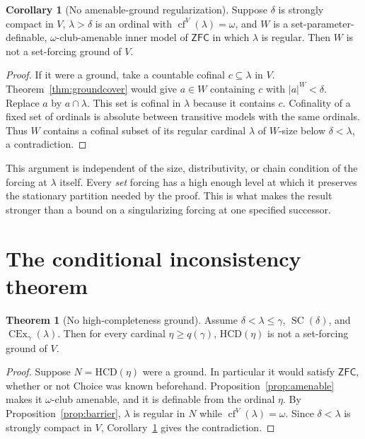 \documentclass[11pt,letterpaper]{article}
\theoremstyle{definition}
\newtheorem{theorem}[definition]{Theorem}
\newtheorem{corollary}[definition]{Corollary}
\numberwithin{equation}{section}
\newcommand{\ZFC}{\mathsf{ZFC}}
\newcommand{\HCD}{\mathrm{HCD}}
\newcommand{\SC}{\operatorname{SC}}
\newcommand{\CEx}{\operatorname{CEx}}
\newcommand{\cf}{\operatorname{cf}}
\begin{document}
\begin{corollary}[No amenable-ground regularization]\label{cor:noregularization}
Suppose $\delta$ is strongly compact in $V$, $\lambda>\delta$ is an
ordinal with $\cf^V(\lambda)=\omega$, and $W$ is a set-parameter-definable,
$\omega$-club-amenable inner model of $\ZFC$ in which $\lambda$ is
regular. Then $W$ is not a set-forcing ground of $V$.
\end{corollary}
\begin{proof}
If it were a ground, take a countable cofinal $c\subseteq\lambda$ in
$V$. Theorem~\ref{thm:groundcover} would give $a\in W$ containing $c$
with $|a|^W<\delta$. Replace $a$ by $a\cap\lambda$. This set is
cofinal in $\lambda$ because it contains $c$. Cofinality of a fixed set
of ordinals is absolute between transitive models with the same
ordinals. Thus $W$ contains a cofinal subset of its regular cardinal
$\lambda$ of $W$-size below $\delta<\lambda$, a contradiction.
\end{proof}

This argument is independent of the size, distributivity, or chain
condition of the forcing at $\lambda$ itself. Every \emph{set} forcing
has a high enough level at which it preserves the stationary partition
needed by the proof. This is what makes the result stronger than a
bound on a singularizing forcing at one specified successor.

\section{The conditional inconsistency theorem}\label{sec:mainproof}

\begin{theorem}[No high-completeness ground]\label{thm:noHCDground}
Assume $\delta<\lambda\le\gamma$, $\SC(\delta)$, and
$\CEx_\gamma(\lambda)$. Then for every cardinal $\eta\ge q(\gamma)$,
$\HCD(\eta)$ is not a set-forcing ground of $V$.
\end{theorem}
\begin{proof}
Suppose $N=\HCD(\eta)$ were a ground. In particular it would satisfy
$\ZFC$, whether or not Choice was known beforehand.
Proposition~\ref{prop:amenable} makes it $\omega$-club amenable, and it
is definable from the ordinal $\eta$. By
Proposition~\ref{prop:barrier}, $\lambda$ is regular in $N$ while
$\cf^V(\lambda)=\omega$. Since $\delta<\lambda$ is strongly compact
in $V$, Corollary~\ref{cor:noregularization} gives the contradiction.
\end{proof}
\end{document}
